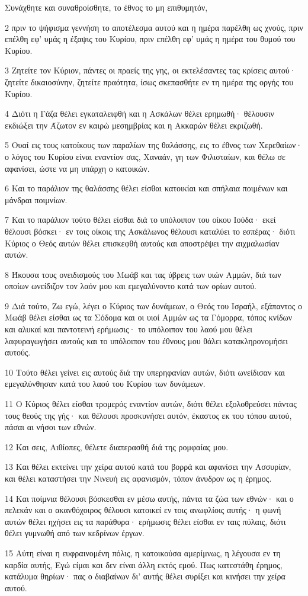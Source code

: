 \par Συνάχθητε και συναθροίσθητε, το έθνος το μη επιθυμητόν,
\par 2 πριν το ψήφισμα γεννήση το αποτέλεσμα αυτού και η ημέρα παρέλθη ως χνούς, πριν επέλθη εφ' υμάς η έξαψις του Κυρίου, πριν επέλθη εφ' υμάς η ημέρα του θυμού του Κυρίου.
\par 3 Ζητείτε τον Κύριον, πάντες οι πραείς της γης, οι εκτελέσαντες τας κρίσεις αυτού· ζητείτε δικαιοσύνην, ζητείτε πραότητα, ίσως σκεπασθήτε εν τη ημέρα της οργής του Κυρίου.
\par 4 Διότι η Γάζα θέλει εγκαταλειφθή και η Ασκάλων θέλει ερημωθή· θέλουσιν εκδιώξει την Άζωτον εν καιρώ μεσημβρίας και η Ακκαρών θέλει εκριζωθή.
\par 5 Ουαί εις τους κατοίκους των παραλίων της θαλάσσης, εις το έθνος των Χερεθαίων· ο λόγος του Κυρίου είναι εναντίον σας, Χαναάν, γη των Φιλισταίων, και θέλω σε αφανίσει, ώστε να μη υπάρχη ο κατοικών.
\par 6 Και το παράλιον της θαλάσσης θέλει είσθαι κατοικίαι και σπήλαια ποιμένων και μάνδραι ποιμνίων.
\par 7 Και το παράλιον τούτο θέλει είσθαι διά το υπόλοιπον του οίκου Ιούδα· εκεί θέλουσι βόσκει· εν τοις οίκοις της Ασκάλωνος θέλουσι καταλύει το εσπέρας· διότι Κύριος ο Θεός αυτών θέλει επισκεφθή αυτούς και αποστρέψει την αιχμαλωσίαν αυτών.
\par 8 Ήκουσα τους ονειδισμούς του Μωάβ και τας ύβρεις των υιών Αμμών, διά των οποίων ωνείδιζον τον λαόν μου και εμεγαλύνοντο κατά των ορίων αυτού.
\par 9 Διά τούτο, Ζω εγώ, λέγει ο Κύριος των δυνάμεων, ο Θεός του Ισραήλ, εξάπαντος ο Μωάβ θέλει είσθαι ως τα Σόδομα και οι υιοί Αμμών ως τα Γόμορρα, τόπος κνίδων και αλυκαί και παντοτεινή ερήμωσις· το υπόλοιπον του λαού μου θέλει λαφυραγωγήσει αυτούς και το υπόλοιπον του έθνους μου θάλει κατακληρονομήσει αυτούς.
\par 10 Τούτο θέλει γείνει εις αυτούς διά την υπερηφανίαν αυτών, διότι ωνείδισαν και εμεγαλύνθησαν κατά του λαού του Κυρίου των δυνάμεων.
\par 11 Ο Κύριος θέλει είσθαι τρομερός εναντίον αυτών, διότι θέλει εξολοθρεύσει πάντας τους θεούς της γής· και θέλουσι προσκυνήσει αυτόν, έκαστος εκ του τόπου αυτού, πάσαι αι νήσοι των εθνών.
\par 12 Και σεις, Αιθίοπες, θέλετε διαπερασθή διά της ρομφαίας μου.
\par 13 Και θέλει εκτείνει την χείρα αυτού κατά του βορρά και αφανίσει την Ασσυρίαν, και θέλει καταστήσει την Νινευή εις αφανισμόν, τόπον άνυδρον ως η έρημος.
\par 14 Και ποίμνια θέλουσι βόσκεσθαι εν μέσω αυτής, πάντα τα ζώα των εθνών· και ο πελεκάν και ο ακανθόχοιρος θέλουσι κατοικεί εν τοις ανωφλίοις αυτής· η φωνή αυτών θέλει ηχήσει εις τα παράθυρα· ερήμωσις θέλει είσθαι εν ταις πύλαις, διότι θέλει γυμνωθή από των κεδρίνων έργων.
\par 15 Αύτη είναι η ευφραινομένη πόλις, η κατοικούσα αμερίμνως, η λέγουσα εν τη καρδία αυτής, Εγώ είμαι και δεν είναι άλλη εκτός εμού. Πως κατεστάθη έρημος, κατάλυμα θηρίων· πας ο διαβαίνων δι' αυτής θέλει συρίξει και κινήσει την χείρα αυτού.

